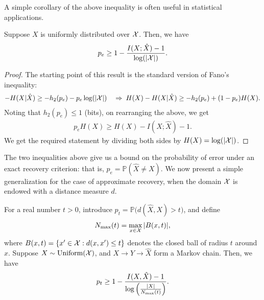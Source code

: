             A simple corollary of the above inequality is often useful in statistical applications. 
            \begin{corollary}
                \label{corollary:fanos-inequality-2} Suppose $X$ is uniformly distributed over $\mathcal{X}$. Then, we have 
                \begin{align}
                    p_e \geq 1 - \frac{ I(X; \hat{X}) - 1}{\log(|\mathcal{X}|)}. 
                \end{align}
            \end{corollary}
            \begin{proof}
                The starting point of this result is the standard version of Fano's  inequality: 
                \begin{align}
                     -H(X|\hat{X}) \geq - h_2(p_e) - p_e \log (|\mathcal{X}|) \quad \Rightarrow \; H(X) - H(X|\hat{X}) \geq -h_2(p_e) + (1-p_e) H(X). 
                \end{align}
                Noting that $h_2(p_e) \leq 1$ (bits), on rearranging the above, we get 
                \begin{align}
                    p_e H(X) \geq H(X) - I(X; \hat{X}) - 1. 
                \end{align}
                We get the required statement by dividing both sides by $H(X) = \log(|\mathcal{X}|)$. 
            \end{proof}

            The two inequalities above give us a bound on the probability of error under an exact recovery criterion: that is, $p_e = \mathbb{P}(\hat{X} \neq X)$. We now present a simple generalization for the case of approximate recovery, when the domain $\mathcal{X}$ is endowed with a distance measure $d$. 
            \begin{corollary}
                \label{corollary:fanos-inequality-distance} For a real number $t>0$, introduce $p_t = \mathbb{P}\big( d(\hat{X}, X) > t\big)$, and define 
                \begin{align}
                    N_{\max}(t) = \max_{x \in \mathcal{X}} |B(x, t)|,    \label{eq:N-max-def}
                \end{align}
                where $B(x, t) = \{x' \in \mathcal{X}: d(x, x') \leq t\}$ denotes the closed ball of radius $t$ around $x$. Suppose $X \sim \text{Uniform}(\mathcal{X})$, and $X \rightarrow Y \rightarrow \hat{X}$ form a Markov chain. Then, we have 
                \begin{align}
                    p_t \geq 1 - \frac{I(X, \hat{X})-1}{\log \left( \frac{|X|}{N_{\max}(t)} \right)}. 
                \end{align}
            \end{corollary}

